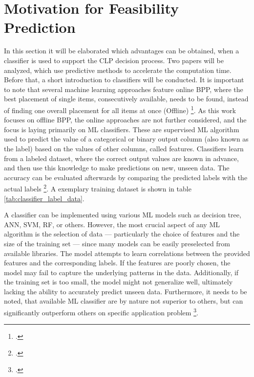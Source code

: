 \chapter{Motivation for Feasibility Prediction}
\label{sec:motivation_feasibility_prediction}
In this section it will be elaborated which advantages can be obtained, when
a classifier is used to support the \gls{CLP} decision process. Two papers will be
analyzed, which use predictive methods to accelerate the computation time. Before that,
a short introduction to classifiers will be conducted. It is important to note that
several machine learning approaches feature
online \gls{BPP}, where the best placement of single items, consecutively available,
needs to be found, instead of finding one overall placement for all items at once
(Offline) \footcite[cf.][p. 1]{ali_-line_2022}. As this work focuses on offline
\gls{BPP}, the online approaches are not further considered, and the focus is laying
primarily on \gls{ML} classifiers. These are supervised \gls{ML} algorithm used to predict the
value of a categorical or binary output column (also known as the label) based on the
values of other columns, called features. Classifiers learn from a labeled dataset,
where the correct output values are known in advance, and then use this knowledge to
make predictions on new, unseen data. The accuracy can be evaluated afterwards by comparing
the predicted labels with the actual labels \footcite[cf.][]{kotsiantis_supervised_2007}.
A exemplary training dataset is shown in table \ref{tab:classifier_label_data}.



A classifier can be implemented using various \gls{ML} models such as decision tree,
\gls{ANN}, \gls{SVM}, \gls{RF}, or others. However, the most crucial aspect of any
\gls{ML} algorithm is the selection of data — particularly the choice of features and
the size of the training set — since many models can be easily preselected from available
libraries. The model attempts to learn correlations between the provided features
and the corresponding labels. If the features are poorly chosen, the model may fail
to capture the underlying patterns in the data. Additionally, if the training set
is too small, the model might not generalize well, ultimately lacking the ability
to accurately predict unseen data. Furthermore, it needs to be noted, that available
\gls{ML} classifier are by nature not superior to others, but can significantly outperform
others on specific application problem \footcite[cf.][pp. 250, 264]{kotsiantis_supervised_2007}.

